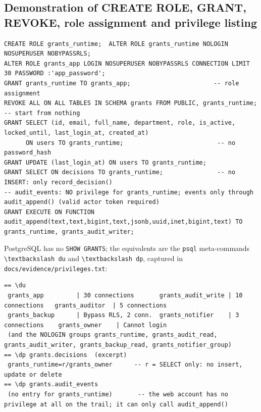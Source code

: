\documentclass[10pt,a4paper]{article}
\newcommand{\code}[1]{\nolinkurl{#1}}
\begin{document}
\subsection{Demonstration of CREATE ROLE, GRANT, REVOKE, role assignment and privilege listing}
\begin{lstlisting}[language=SQLx,caption={database/01\_roles.sql and 04\_grants.sql (excerpts)}]
CREATE ROLE grants_runtime;  ALTER ROLE grants_runtime NOLOGIN NOSUPERUSER NOBYPASSRLS;
ALTER ROLE grants_app LOGIN NOSUPERUSER NOBYPASSRLS CONNECTION LIMIT 30 PASSWORD :'app_password';
GRANT grants_runtime TO grants_app;                       -- role assignment
REVOKE ALL ON ALL TABLES IN SCHEMA grants FROM PUBLIC, grants_runtime;   -- start from nothing
GRANT SELECT (id, email, full_name, department, role, is_active, locked_until, last_login_at, created_at)
      ON users TO grants_runtime;                          -- no password_hash
GRANT UPDATE (last_login_at) ON users TO grants_runtime;
GRANT SELECT ON decisions TO grants_runtime;               -- no INSERT: only record_decision()
-- audit_events: NO privilege for grants_runtime; events only through audit_append() (valid actor token required)
GRANT EXECUTE ON FUNCTION audit_append(text,text,bigint,text,jsonb,uuid,inet,bigint,text) TO grants_runtime, grants_audit_writer;
\end{lstlisting}
PostgreSQL has no \code{SHOW GRANTS}; the equivalents are the \code{psql} meta-commands \code{\textbackslash du} and \code{\textbackslash dp}, captured in \code{docs/evidence/privileges.txt}:
\begin{lstlisting}
== \du
 grants_app         | 30 connections       grants_audit_write | 10 connections   grants_auditor  | 5 connections
 grants_backup      | Bypass RLS, 2 conn.  grants_notifier    | 3 connections    grants_owner    | Cannot login
 (and the NOLOGIN groups grants_runtime, grants_audit_read, grants_audit_writer, grants_backup_read, grants_notifier_group)
== \dp grants.decisions  (excerpt)
 grants_runtime=r/grants_owner      -- r = SELECT only: no insert, update or delete
== \dp grants.audit_events
 (no entry for grants_runtime)       -- the web account has no privilege at all on the trail; it can only call audit_append()
\end{lstlisting}
\end{document}
